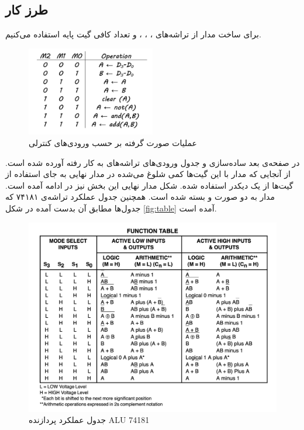 \subsection{
طرز کار
}
برای ساخت مدار از تراشه‌های
،
،
،
و تعداد کافی گیت پایه استفاده می‌کنیم.

\begin{figure}[h!]
    \centering
    \includegraphics[width=0.5\textwidth]{part1/table.png}
    \caption{
    عملیات صورت گرفته بر حسب ورودی‌های کنترلی
    }
    \label{fig:table}
\end{figure}

در صفحه‌ی بعد ساده‌سازی و جدول ورودی‌های تراشه‌های به کار رفته آورده شده است.
از آنجایی که مدار با این گیت‌ها کمی شلوغ می‌شده در مدار نهایی به جای استفاده از گیت‌ها از یک دیکدر استفاده شده.
شکل مدار نهایی این بخش نیز در ادامه آمده است.
مدار به دو صورت
و
بسته شده است.
همچنین جدول عملکرد تراشه‌ی ۷۴۱۸۱ که جدول‌ها مطابق آن بدست آمده در
شکل
\eqref{fig:table}
آمده است.

\begin{figure}[h!]
    \centering
    \includegraphics[width=\textwidth]{part1/datasheet.png}
    \caption{
    جدول عملکرد پردازنده
    ALU
    74181
    }
    \label{fig:table}
\end{figure}

